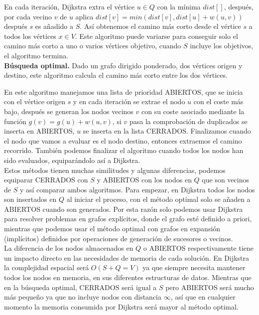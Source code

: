 \documentclass{article}
\begin{document}
En cada iteración, Dijkstra extra el vértice $u \in Q$ con la mínima $dist[]$, después, por cada vecino $v$ de $u$ aplica $dist[v]=min(dist[v],dist[u]+w(u,v))$ después $s$ es añadido a $S$. Así obtenemos el camino más corto desde el vértice $s$ a todos los vértices $x \in V$. Este algoritmo puede variarse para conseguir solo el camino más corto a uno o varios vértices objetivo, cuando $S$ incluye los objetivos, el algoritmo termina.
\\

\textbf{Búsqueda optimal.} Dado un grafo dirigido ponderado, dos vértices origen y destino, este algoritmo calcula el camino más corto entre los dos vértices.

En este algoritmo manejamos una lista de prioridad ABIERTOS, que se inicia con el vértice origen $s$ y en cada iteración se extrae el nodo $u$ con el coste más bajo, después se generan los nodos vecinos $v$ con su coste asociado mediante la función $g(v)=g(u)+w(u,v)$, si $v$ pasa la comprobación de duplicados se inserta en ABIERTOS, $u$ se inserta en la lista CERRADOS. Finalizamos cuando el nodo que vamos a evaluar es el nodo destino, entonces extraemos el camino recorrido. También podemos finalizar el algoritmo cuando todos los nodos han sido evaluados, equiparándolo así a Dijkstra.
\\

Estos métodos tienen muchas similitudes y algunas diferencias, podemos equiparar CERRADOS con $S$ y ABIERTOS con los nodos en $Q$ que son vecinos de $S$  y así comparar ambos algoritmos. Para empezar, en Dijkstra todos los nodos son insertados en $Q$ al iniciar el proceso, con el método optimal solo se añaden a ABIERTOS cuando son generados. Por esta razón solo podemos usar Dijkstra para resolver problemas en grafos explícitos, donde el grafo esté definido a priori, mientras que podemos usar el método optimal con grafos en expansión (implícitos) definidos por operaciones de generación de sucesores o vecinos.
\\

La diferencia de los nodos almacenados en $Q$ o ABIERTOS respectivamente tiene un impacto directo en las necesidades de memoria de cada solución. En Dijkstra la complejidad espacial será $O(S + Q = V)$ ya que siempre necesita mantener todos los nodos en memoria, en sus diferentes estructuras de datos. Mientras que en la búsqueda optimal, CERRADOS será igual a $S$ pero ABIERTOS será mucho más pequeño ya que no incluye nodos con distancia $\infty$, así que en cualquier momento la memoria consumida por Dijkstra será mayor al método optimal.
\\
\end{document}
